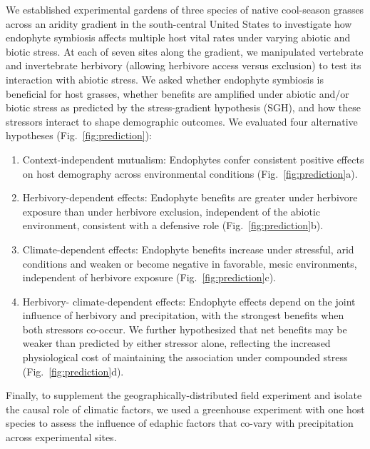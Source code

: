 \documentclass[12pt]{article}\usepackage[]{graphicx}\usepackage[dvipsnames]{xcolor}
\begin{document}
We established experimental gardens of three species of native cool-season grasses across an aridity gradient in the south-central United States to investigate how endophyte symbiosis affects multiple host vital rates under varying abiotic and biotic stress. 
At each of seven sites along the gradient, we manipulated vertebrate and invertebrate herbivory (allowing herbivore access versus exclusion) to test its interaction with abiotic stress.
We asked whether endophyte symbiosis is beneficial for host grasses, whether benefits are amplified under abiotic and/or biotic stress as predicted by the stress-gradient hypothesis (SGH), and how these stressors interact to shape demographic outcomes. 
We evaluated four alternative hypotheses (Fig.~\ref{fig:prediction}):
\begin{enumerate}
\item Context-independent mutualism: Endophytes confer consistent positive effects on host demography across environmental conditions (Fig.~\ref{fig:prediction}a).
\item Herbivory-dependent effects: Endophyte benefits are greater under herbivore exposure than under herbivore exclusion, independent of the abiotic environment, consistent with a defensive role (Fig.~\ref{fig:prediction}b).
\item Climate-dependent effects: Endophyte benefits increase under stressful, arid conditions and weaken or become negative in favorable, mesic environments, independent of herbivore exposure (Fig.~\ref{fig:prediction}c).
\item Herbivory- climate-dependent effects: Endophyte effects depend on the joint influence of herbivory and precipitation, with the strongest benefits when both stressors co-occur. We further hypothesized that net benefits may be weaker than predicted by either stressor alone, reflecting the increased physiological cost of maintaining the association under compounded stress (Fig.~\ref{fig:prediction}d).
\end{enumerate}
Finally, to supplement the geographically-distributed field experiment and isolate the causal role of climatic factors, we used a greenhouse experiment with one host species to assess the influence of edaphic factors that co-vary with precipitation across experimental sites. 
\end{document}
